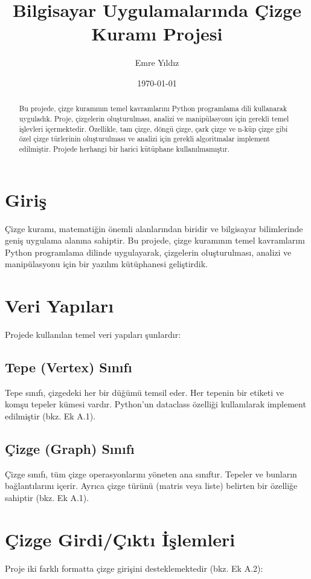 \documentclass[12pt]{article}
\title{Bilgisayar Uygulamalarında Çizge Kuramı Projesi}
\author{Emre Yıldız}
\date{\today}
\begin{document}
\maketitle

\begin{abstract}
Bu projede, çizge kuramının temel kavramlarını Python programlama dili kullanarak uyguladık. Proje, çizgelerin oluşturulması, analizi ve manipülasyonu için gerekli temel işlevleri içermektedir. Özellikle, tam çizge, döngü çizge, çark çizge ve n-küp çizge gibi özel çizge türlerinin oluşturulması ve analizi için gerekli algoritmalar implement edilmiştir. Projede herhangi bir harici kütüphane kullanılmamıştır.
\end{abstract}

\tableofcontents

\section{Giriş}
Çizge kuramı, matematiğin önemli alanlarından biridir ve bilgisayar bilimlerinde geniş uygulama alanına sahiptir. Bu projede, çizge kuramının temel kavramlarını Python programlama dilinde uygulayarak, çizgelerin oluşturulması, analizi ve manipülasyonu için bir yazılım kütüphanesi geliştirdik.

\section{Veri Yapıları}
Projede kullanılan temel veri yapıları şunlardır:

\subsection{Tepe (Vertex) Sınıfı}
Tepe sınıfı, çizgedeki her bir düğümü temsil eder. Her tepenin bir etiketi ve komşu tepeler kümesi vardır. Python'un dataclass özelliği kullanılarak implement edilmiştir (bkz. Ek A.1).

\subsection{Çizge (Graph) Sınıfı}
Çizge sınıfı, tüm çizge operasyonlarını yöneten ana sınıftır. Tepeler ve bunların bağlantılarını içerir. Ayrıca çizge türünü (matris veya liste) belirten bir özelliğe sahiptir (bkz. Ek A.1).

\section{Çizge Girdi/Çıktı İşlemleri}
Proje iki farklı formatta çizge girişini desteklemektedir (bkz. Ek A.2):
\end{document}
